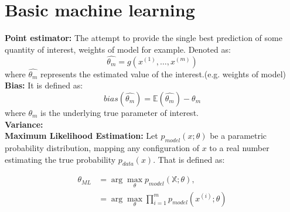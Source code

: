 \documentclass{article}
\newcommand{\argmax}{\arg\!\max}
\begin{document}
\section{Basic machine learning}
\textbf{Point estimator: } The attempt to provide the single best prediction of some quantity of interest, weights of model for example. Denoted as:
$$\hat{\theta_{m}} = g(x^{(1)},\dots,x^{(m)})$$
where $\hat{\theta_{m}}$ represents the estimated value of the interest.(e.g. weights of model)\\
\textbf{Bias: } It is defined as:\\
$$bias(\hat{\theta_{m}}) = \mathbb{E}(\hat{\theta_{m}}) - \theta_{m}$$   
where $\theta_{m}$ is the underlying true parameter of interest. \\
\textbf{Variance:}\\
\textbf{Maximum Likelihood Estimation: }
Let $p_{model}(x;\theta)$ be a parametric probability distribution, mapping any configuration of $x$ to a real number estimating the true probability $p_{data}(x)$. That is defined as:

\begin{align*}
\theta_{ML} &= \argmax_\theta p_{model}(\mathbb{X};\theta),\\
&= \argmax_\theta \prod_{i=1}^{m}p_{model}(x^{(i)};\theta)
\end{align*}
\end{document}
